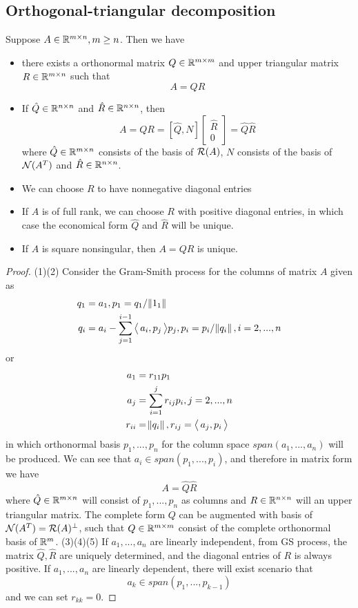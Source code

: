 \begin{refsection}
\subsection{Orthogonal-triangular decomposition}
\begin{theorem}\label{ch:linearalgebra:th:QRDecompositionProperties}
Suppose $A\in \mathbb{R}^{m\times n},m\geq n$. Then we have
\begin{itemize}
	\item there exists a orthonormal matrix $Q\in \mathbb{R}^{m\times m}$ and upper triangular matrix $R\in \mathbb{R}^{m\times n}$ such that $$A = QR$$
	\item If $\hat{Q}\in \mathbb{R}^{n\times n}$ and $\hat{R}\in \mathbb{R}^{n\times n}$, then
	$$A = QR=[\hat{Q},N]\begin{bmatrix}
	\hat{R}\\
	0
	\end{bmatrix} = \hat{Q}\hat{R}$$
	where $\hat{Q}\in \mathbb{R}^{m\times n}$ consists of the basis of $\mathcal{R}(A)$, $N$ consists of the basis of $\mathcal{N}(A^T)$ and $\hat{R}\in \mathbb{R}^{n\times n}$.  
	\item We can choose $R$ to have nonnegative diagonal entries
	\item If $A$ is of full rank, we can choose $R$ with positive diagonal entries, in which case the economical form $\hat{Q}$ and $\hat{R}$ will be unique. 
	\item If $A$ is square nonsingular, then $A = QR$ is unique.
\end{itemize}
\end{theorem}
\begin{proof}
(1)(2) Consider the Gram-Smith process for the columns of matrix $A$ given as
\begin{align*}
	q_1 &= a_1, p_1=q_1/\norm{1_1}\\
	q_i & =a_i - \sum_{j=1}^{i-1} {\left< \, a_i,p_j \, \right>}p_j,p_i = p_i/\norm{q_i},i=2,...,n
\end{align*}
or
\begin{align*}
a_1 &= r_{11}p_1\\
a_j &= \sum_{i=1}^j r_{ij}p_i,j=2,...,n\\
r_{ii} &= \norm{q_i}, r_{ij} = {\left< \, a_j,p_i \, \right>}
\end{align*}
in which orthonormal basis $p_1,...,p_n$ for the column space $span(a_1,...,a_n)$ will be produced. 
We can see that $a_i \in span(p_1,...,p_i)$, and therefore in matrix form we have
$$A = \hat{Q}\hat{R}$$
where $\hat{Q} \in \mathbb{R}^{m\times n}$ will consist of $p_1,...,p_n$ as columns and $R\in \mathbb{R}^{n\times n}$ will an upper triangular matrix. 
The complete form $Q$ can be augmented with basis of $\mathcal{N}(A^T) = \mathcal{R}(A)^\perp$, such that $Q\in \mathbb{R}^{m\times m}$ consist of the complete orthonormal basis of $\mathbb{R}^m$.
(3)(4)(5) If $a_1,...,a_n$ are linearly independent, from GS process, the matrix $\hat{Q},\hat{R}$ are uniquely determined, and the diagonal entries of $R$ is always positive. If $a_1,...,a_n$ are linearly dependent, there will exist scenario that 
$$a_k \in span(p_1,...,p_{k-1})$$ and we can set $r_{kk} = 0$. 
\end{proof}


\end{refsection}
